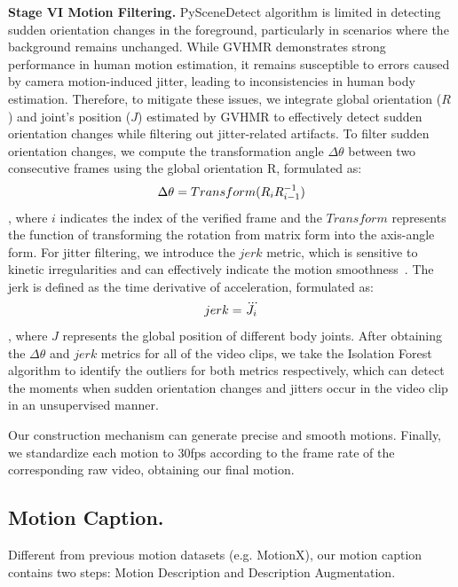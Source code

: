 \textbf{Stage VI Motion Filtering.} 
PySceneDetect algorithm is limited in detecting sudden orientation changes in the foreground, particularly in scenarios where the background remains unchanged. 
While GVHMR demonstrates strong performance in human motion estimation, it remains susceptible to errors caused by camera motion-induced jitter, leading to inconsistencies in human body estimation. Therefore, to mitigate these issues, we integrate global orientation ($R$) and joint's position ($J$) estimated by GVHMR to effectively detect sudden orientation changes while filtering out jitter-related artifacts.
To filter sudden orientation changes, we compute the transformation angle $\Delta\theta$ between two consecutive frames using the global orientation R, formulated as:
\vspace{-0.5em}
\begin{equation}
   \Delta\theta = Transform(R_iR_{i-1}^{-1})
\label{eq:orient}
\vspace{-0.5em}
\end{equation}, where $i$ indicates the index of the verified frame and the $Transform$ represents the function of transforming the rotation from matrix form into the axis-angle form. For jitter filtering, we introduce the $jerk$ metric, which is sensitive to kinetic irregularities and can effectively indicate the motion smoothness~\citep{barquero2024seamless}. The jerk is defined as the time derivative of acceleration, formulated as: 
\vspace{-0.5em}
\begin{equation}
   jerk = \dddot{J_i}
\label{eq:jerk}
\vspace{-0.5em}
\end{equation}, where $J$ represents the global position of different body joints.
After obtaining the $\Delta\theta$ and $jerk$ metrics for all of the video clips, we take the Isolation Forest~\citep{liu2008isolation} algorithm to identify the outliers for both metrics respectively, which can detect the moments when sudden orientation changes and jitters occur in the video clip in an unsupervised manner.  

Our construction mechanism can generate precise and smooth motions. Finally, we standardize each motion to 30fps according to the frame rate of the corresponding raw video, obtaining our final motion.

\subsection{Motion Caption.} Different from previous motion datasets (e.g. MotionX), our motion caption contains two steps: Motion Description and Description Augmentation. 


